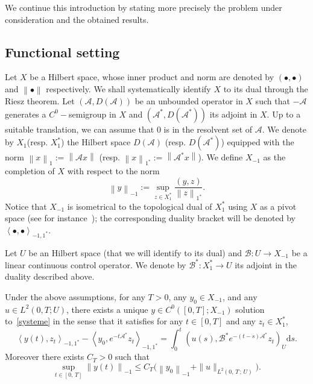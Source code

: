 \documentclass[10pt]{amsart}
\theoremstyle{definition}\newtheorem{defi}[theo]{Definition}\newtheorem{rema}[theo]{Remark}\newtheorem{exam}[theo]{Example}\newtheorem{exem}[theo]{Example}\newtheorem{nota}[theo]{Notation}
\newcommand\A{\mathcal{A}}
\newcommand\As{\mathcal{A}^*}
\newcommand\B{\mathcal{B}}
\newcommand\Bs{\mathcal{B}^*}
\newcommand{\DA}{D(\A)}
\newcommand{\Xun}{X_1}
\newcommand{\Xuns}{X_1^*}
\newcommand{\Xmun}{X_{-1}}
\newcommand{\normeX}[1]{\left\| #1 \right\|}
\newcommand{\normeXun}[1]{\left\| #1 \right\|_{1}}
\newcommand{\normeXuns}[1]{\left\| #1 \right\|_{1^*}}
\newcommand{\normeXmun}[1]{\left\| #1 \right\|_{-1}}
\newcommand{\psX}[2]{\left(#1, #2 \right)}
\newcommand{\psU}[2]{\left(#1, #2 \right)_U}
\newcommand{\dualX}[2]{\left\langle #1, #2 \right\rangle_{-1,1^*}}
\newcommand{\md}{\mathrm{d}}
\renewcommand{\cdot}{{\scriptstyle \bullet}}
\begin{document}
We continue this introduction by stating more precisely the problem under consideration and the obtained results.



\subsection{Functional setting}

Let $X$ be a Hilbert space, whose inner product and norm are denoted by $\psX{\cdot}{\cdot}$ and $\normeX{\cdot}$ respectively. We shall systematically identify $X$ to its dual through the Riesz theorem. Let $(\A, \DA)$ be an unbounded operator in $X$ such that $-\A$ generates a $C^0-$semigroup in $X$ and $(\As,D(\As))$ its adjoint in $X$. Up to a suitable translation, we can assume that $0$ is in the resolvent set of $\A$. We denote by $\Xun$\linebreak(resp. $\Xuns$) the Hilbert space $D(\A)$ (resp. $D(\As)$) equipped with the norm $\normeXun{x} := \normeX{\A x}$ (resp. $\normeXuns{x} := \normeX{\As x}$). We define $\Xmun$ as the completion of $X$ with respect to the norm
\begin{equation*}\label{Def:NormeX-1}
\normeXmun{y} := \sup_{z \in X_1^*} \frac{\psX{y}{z}}{\normeXuns{z}}.
\end{equation*}
Notice that $\Xmun$ is isometrical to the topological dual of $\Xuns$ using $X$ as a pivot space (see for instance~\cite[Proposition~2.10.2]{TucsnakWeissBook}); the corresponding duality bracket will be denoted by $\dualX{\cdot}{\cdot}$.

Let $U$ be an Hilbert space (that we will identify to its dual) and $\B:U\to \Xmun$ be a linear continuous control operator. We denote by $\Bs:\Xuns\to U$ its adjoint in the duality described above.

\begin{prop}\label{Prop:WellposednessGeneral}
Under the above assumptions, for any $T>0$, any $y_0 \in \Xmun$, and any $u \in L^2(0,T ; U)$, there exists a unique $y \in C^0([0,T]; \Xmun)$ solution to~\eqref{systeme} in the sense that it satisfies for any $t \in [0,T]$ and any $z_t \in \Xuns$,
\begin{equation}\label{CaracterisationDualeSolutionsGeneral}
\dualX{y(t)}{z_t} - \dualX{y_0}{e^{-t\As} z_t} = \int_0^t \psU{u(s)}{ \Bs e^{-(t-s) \As} z_t} \md s.
\end{equation}
Moreover there exists $C_T>0$ such that
\[
\sup\limits_{t \in [0,\,T]} \normeXmun{y(t)} \leq C_T \big(\normeXmun{y_0} + \| u \|_{L^2(0,\,T\,;\,U)} \big).
\]
\end{prop}
\end{document}
